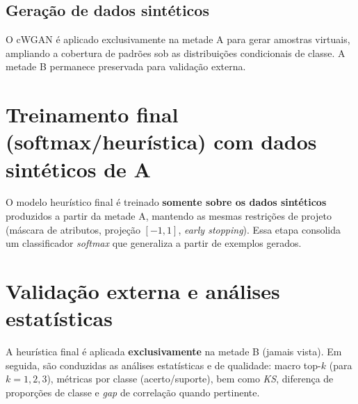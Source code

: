 \documentclass[12pt,a4paper]{article}
\begin{document}
\subsection{Geração de dados sintéticos}
O cWGAN é aplicado exclusivamente na metade A para gerar amostras virtuais, ampliando a cobertura de padrões sob as distribuições condicionais de classe. A metade B permanece preservada para validação externa.

\section{Treinamento final (softmax/heurística) com \textbf{dados sintéticos} de A}
O modelo heurístico final é treinado \textbf{somente sobre os dados sintéticos} produzidos a partir da metade A, mantendo as mesmas restrições de projeto (máscara de atributos, projeção $[-1,1]$, \emph{early stopping}). Essa etapa consolida um classificador \emph{softmax} que generaliza a partir de exemplos gerados.

\section{Validação externa e análises estatísticas}
A heurística final é aplicada \textbf{exclusivamente} na metade B (jamais vista). Em seguida, são conduzidas as análises estatísticas e de qualidade: macro top-$k$ (para $k=1,2,3$), métricas por classe (acerto/suporte), bem como \emph{KS}, diferença de proporções de classe e \emph{gap} de correlação quando pertinente.
\end{document}
